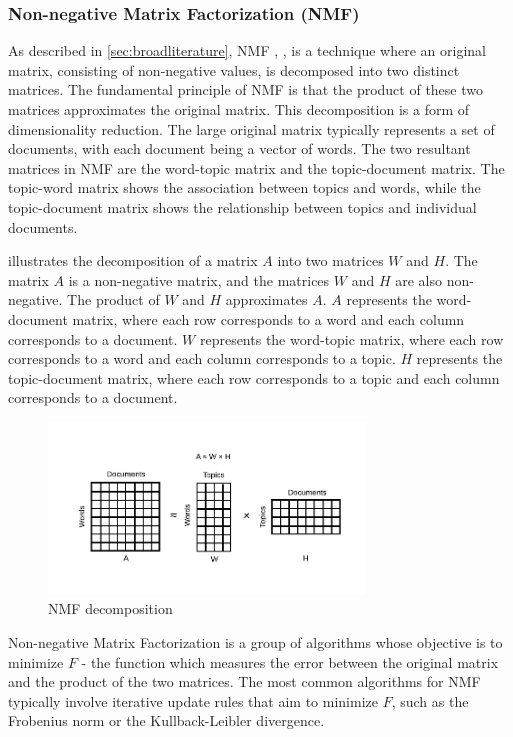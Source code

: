 \documentclass{article}
\begin{document}
\subsubsection{Non-negative Matrix Factorization (NMF)}
As described in \cref{sec:broadliterature}, NMF \cite{shahnaz_document_2006}, \cite{kasiviswanathan_emerging_2011}, \cite{yan_learning_2013} is a technique where an original matrix, consisting of non-negative values, is decomposed into two distinct matrices. The fundamental principle of NMF is that the product of these two matrices approximates the original matrix. This decomposition is a form of dimensionality reduction. The large original matrix typically represents a set of documents, with each document being a vector of words. The two resultant matrices in NMF are the word-topic matrix and the topic-document matrix. The topic-word matrix shows the association between topics and words, while the topic-document matrix shows the relationship between topics and individual documents.

 illustrates the decomposition of a matrix \(A\) into two matrices \(W\) and \(H\). The matrix \(A\) is a non-negative matrix, and the matrices \(W\) and \(H\) are also non-negative. The product of \(W\) and \(H\) approximates \(A\). \(A\) represents the word-document matrix, where each row corresponds to a word and each column corresponds to a document. \(W\) represents the word-topic matrix, where each row corresponds to a word and each column corresponds to a topic. \(H\) represents the topic-document matrix, where each row corresponds to a topic and each column corresponds to a document.

\begin{figure}[h] %
    \centering
    \includegraphics[width=0.75\textwidth]{images/nmf.pdf}
    \caption{NMF decomposition}
    \label{fig:nmf}
\end{figure}

Non-negative Matrix Factorization is a group of algorithms whose objective is to minimize $F$ - the function which measures the error between the original matrix and the product of the two matrices. The most common algorithms for NMF typically involve iterative update rules that aim to minimize $F$, such as the Frobenius norm or the Kullback-Leibler divergence.
\end{document}
